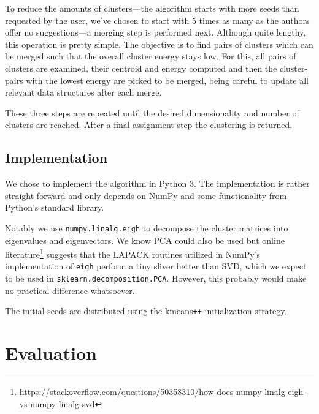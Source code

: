 \documentclass[english]{scrartcl}
\begin{document}
To reduce the amounts of clusters---the algorithm starts with more seeds than
requested by the user, we've chosen to start with 5 times as many as the
authors offer no suggestions---a merging step is performed next. Although quite
lengthy, this operation is pretty simple. The objective is to find pairs of
clusters which can be merged such that the overall cluster energy stays low.
For this, all pairs of clusters are examined, their centroid and energy
computed and then the cluster-pairs with the lowest energy are picked to be merged, being
careful to update all relevant data structures after each merge.

These three steps are repeated until the desired dimensionality and number of
clusters are reached. After a final assignment step the clustering is returned.


\subsection{Implementation}

We chose to implement the algorithm in Python 3. The implementation is rather straight
forward and only depends on NumPy and some functionality from Python's standard
library.

Notably we use \texttt{numpy.linalg.eigh} to decompose the cluster matrices
into eigenvalues and eigenvectors. We know PCA could also be used but online
literature\footnote{\url{https://stackoverflow.com/questions/50358310/how-does-numpy-linalg-eigh-vs-numpy-linalg-svd}}
suggests that the LAPACK routines utilized in NumPy's implementation of
\texttt{eigh} perform a tiny sliver better than SVD, which we expect to be used
in \texttt{sklearn.decomposition.PCA}.  However, this probably would make no
practical difference whatsoever.

The initial seeds are distributed using the kmeans\texttt{++} initialization strategy.

\section{Evaluation}
\end{document}
